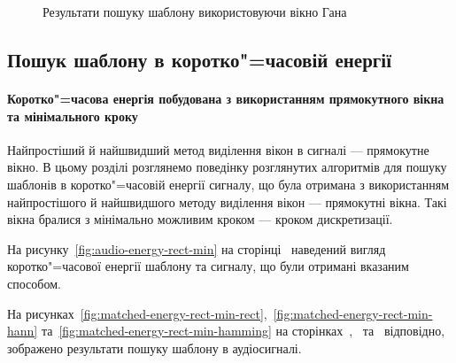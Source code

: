\begin{figure}[h]
            \caption{Результати пошуку шаблону використовуючи вікно Гана}
            \label{fig:audio-plain-hanning}
        \end{figure}
        \clearpage
    \subsection{Пошук шаблону в коротко"=часовій енергії}
        \paragraph{Коротко"=часова енергія побудована з використанням прямокутного вікна та мінімального кроку}
            Найпростіший й найшвидший метод виділення вікон в сигналі --- прямокутне вікно.
            В цьому розділі розглянемо поведінку розглянутих алгоритмів для пошуку шаблонів в коротко"=часовій енергії
            сигналу, що була отримана з використанням найпростішого й найшвидшого методу виділення вікон ---
            прямокутні вікна.
            Такі вікна бралися з мінімально можливим кроком --- кроком дискретизації.

            На рисунку~\ref{fig:audio-energy-rect-min} на сторінці~\pageref{fig:audio-energy-rect-min} наведений
            вигляд коротко"=часової енергії шаблону та сигналу, що були отримані вказаним способом.

            На рисунках~\ref{fig:matched-energy-rect-min-rect},~\ref{fig:matched-energy-rect-min-hann}
            та~\ref{fig:matched-energy-rect-min-hamming} на
            сторінках~\pageref{fig:matched-energy-rect-min-rect},~\pageref{fig:matched-energy-rect-min-hann}
            та~\pageref{fig:matched-energy-rect-min-hamming} відповідно, зображено результати пошуку шаблону в
            аудіосигналі.

